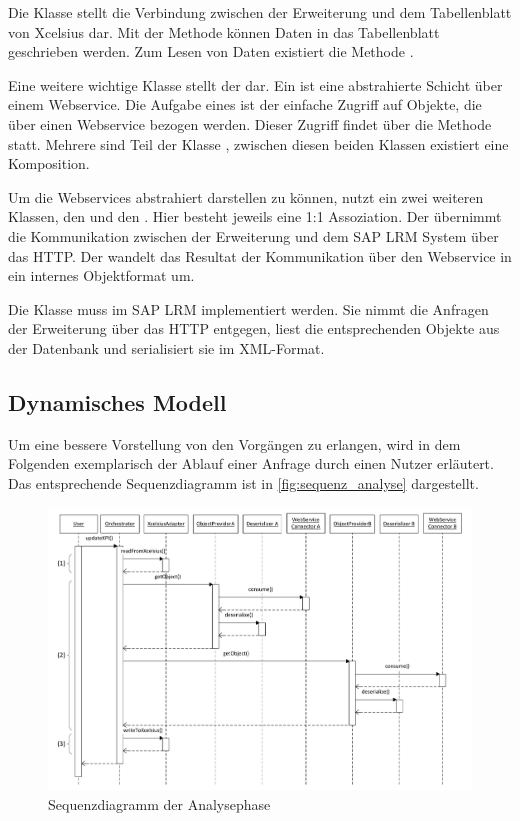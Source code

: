 \begin{onehalfspacing}
Die Klasse  stellt die Verbindung zwischen der Erweiterung und dem Tabellenblatt von Xcelsius dar. Mit der Methode  können Daten in das Tabellenblatt geschrieben werden. Zum Lesen von Daten existiert die Methode .

Eine weitere wichtige Klasse stellt der  dar. Ein  ist eine abstrahierte Schicht über einem Webservice. Die Aufgabe eines  ist der einfache Zugriff auf Objekte, die über einen Webservice bezogen werden. Dieser Zugriff findet über die Methode  statt. Mehrere  sind Teil der Klasse , zwischen diesen beiden Klassen existiert eine Komposition.

Um die Webservices abstrahiert darstellen zu können, nutzt ein  zwei weiteren Klassen, den  und den . Hier besteht jeweils eine 1:1 Assoziation. Der  übernimmt die Kommunikation zwischen der Erweiterung und dem SAP LRM System über das \gls{HTTP}. Der  wandelt das Resultat der Kommunikation über den Webservice in ein internes Objektformat um.

Die Klasse  muss im SAP LRM implementiert werden. Sie nimmt die Anfragen der Erweiterung über das \gls{HTTP} entgegen, liest die entsprechenden Objekte aus der Datenbank und serialisiert sie im \gls{XML}-Format.

\subsection{Dynamisches Modell}
Um eine bessere Vorstellung von den Vorgängen zu erlangen, wird in dem Folgenden exemplarisch der Ablauf einer Anfrage durch einen Nutzer erläutert. Das entsprechende Sequenzdiagramm ist in \vref{fig:sequenz_analyse} dargestellt.

\begin{figure}[h]
\centering
\setlength{\unitlength}{1mm}
\includegraphics[width=15cm]{Visio/Analyse-Sequenz.pdf}
\caption{Sequenzdiagramm der Analysephase \label{fig:sequenz_analyse}}
\end{figure}


\end{onehalfspacing}
